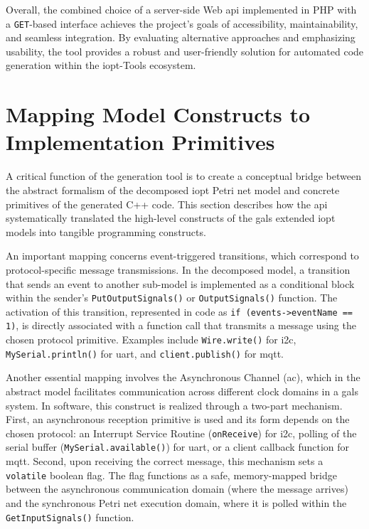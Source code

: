 Overall, the combined choice of a server-side Web \gls{api} implemented in PHP with a \texttt{GET}-based interface achieves the project's goals of accessibility, maintainability, and seamless integration. By evaluating alternative approaches and emphasizing usability, the tool provides a robust and user-friendly solution for automated code generation within the \gls{iopt}-Tools ecosystem.




\section{Mapping Model Constructs to Implementation Primitives}
\label{sec:mapping_constructs}

A critical function of the generation tool is to create a conceptual bridge between the abstract formalism of the decomposed \gls{iopt} Petri net model and concrete primitives of the generated C++ code. This section describes how the \gls{api} systematically translated the high-level constructs of the \gls{gals} extended \gls{iopt} models into tangible programming constructs.

An important mapping concerns event-triggered transitions, which correspond to protocol-specific message transmissions. In the decomposed model, a transition that sends an event to another sub-model is implemented as a conditional block within the sender's \texttt{PutOutputSignals()} or \texttt{OutputSignals()} function. The activation of this transition, represented in code as \texttt{if (events->eventName == 1)}, is directly associated with a function call that transmits a message using the chosen protocol primitive. Examples include \texttt{Wire.write()} for \gls{i2c}, \texttt{MySerial.println()} for \gls{uart}, and \texttt{client.publish()} for \gls{mqtt}.

Another essential mapping involves the Asynchronous Channel (\gls{ac}), which in the abstract model facilitates communication across different clock domains in a \gls{gals} system. In software, this construct is realized through a two-part mechanism. First, an asynchronous reception primitive is used and its form depends on the chosen protocol: an Interrupt Service Routine (\texttt{onReceive}) for \gls{i2c}, polling of the serial buffer (\texttt{MySerial.available()}) for \gls{uart}, or a client callback function for \gls{mqtt}. Second, upon receiving the correct message, this mechanism sets a \texttt{volatile} boolean flag. The flag functions as a safe, memory-mapped bridge between the asynchronous communication domain (where the message arrives) and the synchronous Petri net execution domain, where it is polled within the \texttt{GetInputSignals()} function.

